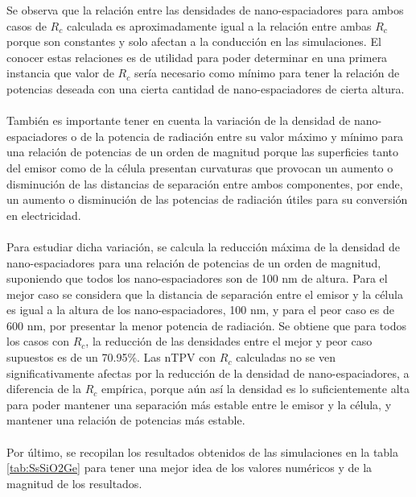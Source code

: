 Se observa que la relación entre las densidades de nano-espaciadores para ambos casos de $R_c$ calculada es aproximadamente igual a la relación entre ambas $R_c$ porque son constantes y solo afectan a la conducción en las simulaciones. El conocer estas relaciones es de utilidad para poder determinar en una primera instancia que valor de $R_c$ sería necesario como mínimo para tener la relación de potencias deseada con una cierta cantidad de nano-espaciadores de cierta altura.\\\\
También es importante tener en cuenta la variación de la densidad de nano-espaciadores o de la potencia de radiación entre su valor máximo y mínimo para una relación de potencias de un orden de magnitud porque las superficies tanto del emisor como de la célula presentan curvaturas que provocan un aumento o disminución de las distancias de separación entre ambos componentes, por ende, un aumento o disminución de las potencias de radiación útiles para su conversión en electricidad.\\\\
Para estudiar dicha variación, se calcula la reducción máxima de la densidad de nano-espaciadores para una relación de potencias de un orden de magnitud, suponiendo que todos los nano-espaciadores son de 100 nm de altura. Para el mejor caso se considera que la distancia de separación entre el emisor y la célula es igual a la altura de los nano-espaciadores, 100 nm, y para el peor caso es de 600 nm, por presentar la menor potencia de radiación.
Se obtiene que para todos los casos con $R_c$, la reducción de las densidades entre el mejor y peor caso supuestos es de un 70.95\%. Las nTPV con $R_c$ calculadas no se ven significativamente afectas por la reducción de la densidad de nano-espaciadores, a diferencia de la $R_c$ empírica, porque aún así la densidad es lo suficientemente alta para poder mantener una separación más estable entre le emisor y la célula, y mantener una relación de potencias más estable.\\\\
Por último, se recopilan los resultados obtenidos de las simulaciones en la tabla \ref{tab:SsSiO2Ge} para tener una mejor idea de los valores numéricos y de la magnitud de los resultados.
